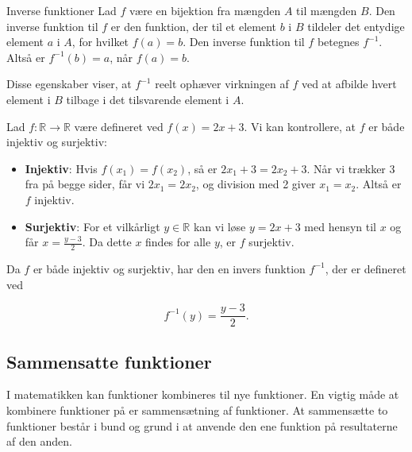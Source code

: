 \begin{definition}{Inverse funktioner}
Lad $f$ være en bijektion fra mængden $A$ til mængden $B$. Den inverse funktion til $f$ er den funktion, der til et element $b$ i $B$ tildeler det entydige element $a$ i $A$, for hvilket $f(a)=b$. Den inverse funktion til $f$ betegnes $f^{-1}$. Altså er $f^{-1}(b)=a$, når $f(a)=b$.    
\end{definition}

Disse egenskaber viser, at \( f^{-1} \) reelt ophæver virkningen af \( f \) ved at afbilde hvert element i \( B \) tilbage i det tilsvarende element i \( A \).

\begin{example}


Lad \( f: \mathbb{R} \rightarrow \mathbb{R} \) være defineret ved \( f(x) = 2x + 3 \). Vi kan kontrollere, at \( f \) er både injektiv og surjektiv:

\begin{itemize}
    \item \textbf{Injektiv}: Hvis \( f(x_1) = f(x_2) \), så er \( 2x_1 + 3 = 2x_2 + 3 \). Når vi trækker 3 fra på begge sider, får vi \( 2x_1 = 2x_2 \), og division med 2 giver \( x_1 = x_2 \). Altså er \( f \) injektiv.
    \item \textbf{Surjektiv}: For et vilkårligt \( y \in \mathbb{R} \) kan vi løse \( y = 2x + 3 \) med hensyn til \( x \) og får \( x = \frac{y - 3}{2} \). Da dette \( x \) findes for alle \( y \), er \( f \) surjektiv.
\end{itemize}

Da \( f \) er både injektiv og surjektiv, har den en invers funktion \( f^{-1} \), der er defineret ved

\[
f^{-1}(y) = \frac{y - 3}{2}.
\]

  
\end{example}

\subsection*{Sammensatte funktioner}
I matematikken kan funktioner kombineres til nye funktioner. En vigtig måde at kombinere funktioner på er sammensætning af funktioner. At sammensætte to funktioner består i bund og grund i at anvende den ene funktion på resultaterne af den anden.

